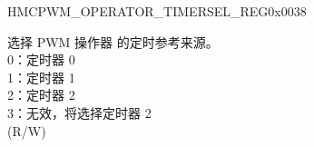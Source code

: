 \begin{register}{H}{MCPWM\_OPERATOR\_TIMERSEL\_REG}{0x0038}\label{regdesc:MCPWMOPERATORTIMERSELREG}
%
%
%
%
\regnewline%
\begin{regdesc}\begin{reglist}
\label{fielddesc:MCPWMOPERATORNTIMERSEL}\item [MCPWM\_OPERATOR\regindex{n}\_TIMERSEL] 选择 PWM 操作器 的定时参考来源。\\
0：定时器 0\\
1：定时器 1\\
2：定时器 2\\
3：无效，将选择定时器 2\\
(R/W)
\end{reglist}\end{regdesc}
\end{register}


